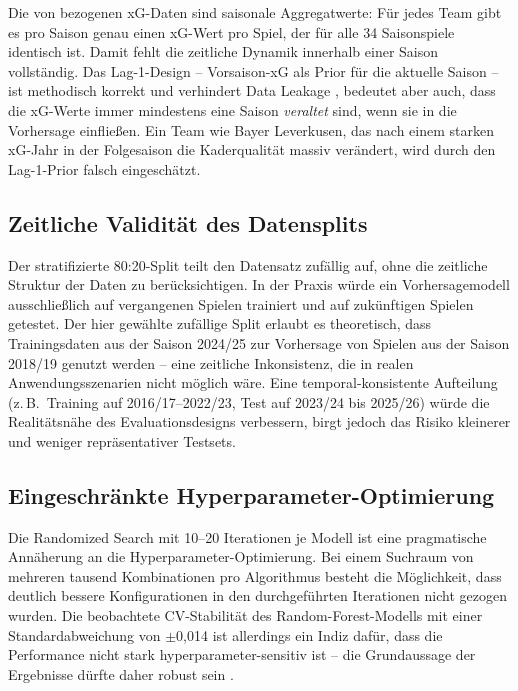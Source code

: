 Die von \textcite{Understat2024} bezogenen xG-Daten sind saisonale
Aggregatwerte: Für jedes Team gibt es pro Saison genau einen xG-Wert
pro Spiel, der für alle 34 Saisonspiele identisch ist. Damit fehlt
die zeitliche Dynamik innerhalb einer Saison vollständig. Das Lag-1-Design
-- Vorsaison-xG als Prior für die aktuelle Saison -- ist methodisch
korrekt und verhindert Data Leakage \cite{KaufmanRossetPerlich2012},
bedeutet aber auch, dass die xG-Werte immer mindestens eine Saison
\emph{veraltet} sind, wenn sie in die Vorhersage einfließen. Ein Team
wie Bayer Leverkusen, das nach einem starken xG-Jahr in der Folgesaison
die Kaderqualität massiv verändert, wird durch den Lag-1-Prior falsch
eingeschätzt.

\subsection{Zeitliche Validität des Datensplits}

Der stratifizierte 80:20-Split teilt den Datensatz zufällig auf, ohne
die zeitliche Struktur der Daten zu berücksichtigen. In der Praxis
würde ein Vorhersagemodell ausschließlich auf vergangenen Spielen
trainiert und auf zukünftigen Spielen getestet. Der hier gewählte
zufällige Split erlaubt es theoretisch, dass Trainingsdaten aus der
Saison 2024/25 zur Vorhersage von Spielen aus der Saison 2018/19
genutzt werden -- eine zeitliche Inkonsistenz, die in realen
Anwendungsszenarien nicht möglich wäre. Eine temporal-konsistente
Aufteilung (z.\,B.\ Training auf 2016/17--2022/23, Test auf 2023/24
bis 2025/26) würde die Realitätsnähe des Evaluationsdesigns verbessern,
birgt jedoch das Risiko kleinerer und weniger repräsentativer Testsets.

\subsection{Eingeschränkte Hyperparameter-Optimierung}

Die Randomized Search mit 10--20 Iterationen je Modell ist eine
pragmatische Annäherung an die Hyperparameter-Optimierung. Bei einem
Suchraum von mehreren tausend Kombinationen pro Algorithmus besteht
die Möglichkeit, dass deutlich bessere Konfigurationen in den
durchgeführten Iterationen nicht gezogen wurden. Die beobachtete
CV-Stabilität des Random-Forest-Modells mit einer Standardabweichung
von $\pm$0,014 ist allerdings ein Indiz dafür, dass die Performance
nicht stark hyperparameter-sensitiv ist -- die Grundaussage der Ergebnisse
dürfte daher robust sein \cite{JamesEtAl2021}.

